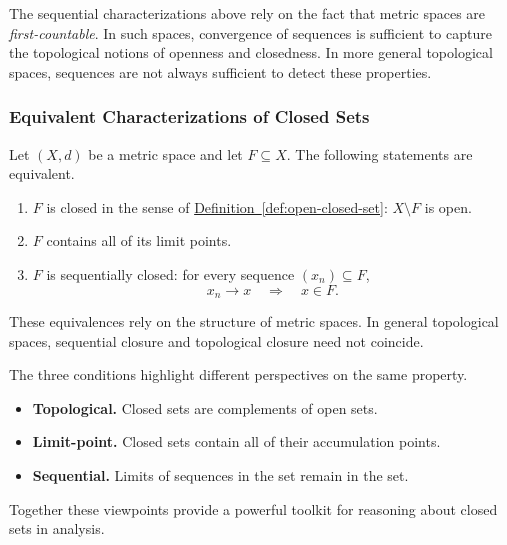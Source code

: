 \begin{remark*}
\label{rem:first-countable}
The sequential characterizations above rely on the fact that metric
spaces are \emph{first-countable}.
In such spaces, convergence of sequences is sufficient to capture the
topological notions of openness and closedness.
In more general topological spaces, sequences are not always sufficient
to detect these properties.
\end{remark*}

\subsubsection{Equivalent Characterizations of Closed Sets}

\begin{theorem}
\label{thm:closed-equiv}
Let $(X,d)$ be a metric space and let $F \subseteq X$.
The following statements are equivalent.

\begin{enumerate}[label=(\roman*)]
\item $F$ is closed in the sense of
      \hyperref[def:open-closed-set]{Definition~\ref*{def:open-closed-set}}:
      $X \setminus F$ is open.

\item $F$ contains all of its limit points.

\item $F$ is sequentially closed: for every sequence
      $(x_n) \subseteq F$,
      \[
        x_n \to x \quad\Rightarrow\quad x \in F.
      \]
\end{enumerate}
\end{theorem}

\begin{remark*}
These equivalences rely on the structure of metric spaces.
In general topological spaces, sequential closure and topological
closure need not coincide.
\end{remark*}

\begin{remark*}[Interpretation]
The three conditions highlight different perspectives on the same property.
\begin{itemize}
  \item \textbf{Topological.} Closed sets are complements of open sets.
  \item \textbf{Limit-point.} Closed sets contain all of their
        accumulation points.
  \item \textbf{Sequential.} Limits of sequences in the set remain
        in the set.
\end{itemize}
Together these viewpoints provide a powerful toolkit for reasoning
about closed sets in analysis.
\end{remark*}


